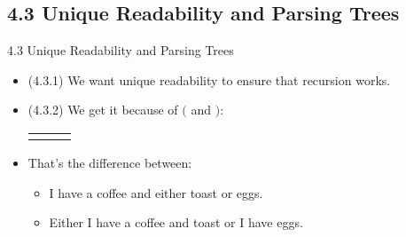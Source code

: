 \subsection{4.3 Unique Readability and Parsing Trees}

\begin{frame}{4.3 Unique Readability and Parsing Trees}

	\begin{itemize}
	
		\item (4.3.1) We want unique readability to ensure that recursion works.
		
		\item (4.3.2) We get it because of $($ and $)$:
		
	\begin{center}
		
		\begin{tabular}{c c c}
		\begin{tikzpicture}
		{\Tree [.$p\land q\lor r$ [.$p$ ] [.$q\lor r$ [.$q$ ] [.$r$ ] ] ]}
		\end{tikzpicture}

		& 
		
		\qquad \raisebox{7.5ex}{vs.} \qquad 
				\begin{tikzpicture}

		{\Tree [.$p\land q\lor r$ [.$p\land q$ [.$p$ ] [.$q$ ] ] [.$r$ ] ]}
		\end{tikzpicture}

		\end{tabular}
		\end{center}
		
		\item That's the difference between:
		\begin{itemize}
	
		\item I have a coffee and either toast or eggs.
		
		\item Either I have a coffee and toast or I have eggs.
	
	\end{itemize}
	
	\end{itemize}

\end{frame}

